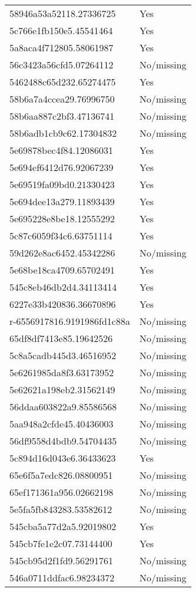 \begin{tabular}{ll}
58946a53a52118.27336725 & Yes \\
5c766e1fb150e5.45541464 & Yes \\
5a8aca4f712805.58061987 & Yes \\
56c3423a56cfd5.07264112 & No/missing \\
5462488c65d232.65274475 & Yes \\
58b6a7a4ccea29.76996750 & No/missing \\
58b6aa887c2bf3.47136741 & No/missing \\
58b6adb1cb9c62.17304832 & No/missing \\
5e69878bec4f84.12086031 & Yes \\
5e694ef6412d76.92067239 & Yes \\
5e69519fa09bd0.21330423 & Yes \\
5e694dee13a279.11893439 & Yes \\
5e695228e8be18.12555292 & Yes \\
5c87c6059f34c6.63751114 & Yes \\
59d262e8ac6452.45342286 & No/missing \\
5e68be18ca4709.65702491 & Yes \\
545c8eb46db2d4.34113414 & Yes \\
6227e33b420836.36670896 & Yes \\
r-6556917816.9191986fd1c88a & No/missing \\
65df8df7413e85.19642526 & No/missing \\
5c8a5cadb445d3.46516952 & No/missing \\
5e6261985da8f3.63173952 & No/missing \\
5e62621a198eb2.31562149 & No/missing \\
56ddaa603822a9.85586568 & No/missing \\
5aa948a2cfde45.40436003 & No/missing \\
56df9558d4bdb9.54704435 & No/missing \\
5c894d16d043e6.36433623 & Yes \\
65e6f5a7edc826.08800951 & No/missing \\
65ef171361a956.02662198 & No/missing \\
5e5fa5fb843283.53582612 & No/missing \\
545cba5a77d2a5.92019802 & Yes \\
545cb7fe1e2c07.73144400 & Yes \\
545cb95d2f1fd9.56291761 & No/missing \\
546a0711ddfac6.98234372 & No/missing \\

\end{tabular}

